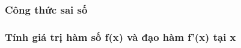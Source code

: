 \subsubsection{Công thức sai số}\label{cuxf4ng-thux1ee9c-sai-sux1ed1}

\begin{Shaded}
\begin{Highlighting}[]
   
     
\NormalTok{\}}

     
     
\NormalTok{\}}
\end{Highlighting}
\end{Shaded}

\subsubsection{Tính giá trị hàm số f(x) và đạo hàm f'(x) tại
x}\label{tuxednh-giuxe1-trux1ecb-huxe0m-sux1ed1-fx-vuxe0-ux111ux1ea1o-huxe0m-fx-tux1ea1i-x}

